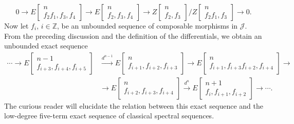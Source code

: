 \clearpage
{}%
\begingroup\small\setlength{\parskip}{0pt}\setlength{\emergencystretch}{2.5em}
\[
0\longrightarrow
E\!\begin{bmatrix}n\\ f_2f_1,f_3,f_4\end{bmatrix}
\longrightarrow
E\!\begin{bmatrix}n\\ f_2,f_3,f_4\end{bmatrix}
\longrightarrow
Z\!\begin{bmatrix}n\\ f_2,f_3\end{bmatrix}
 \Big/
Z\!\begin{bmatrix}n\\ f_2f_1,f_3\end{bmatrix}
\longrightarrow0.
\]
Now let $f_i$, $i\in\mathbb Z$, be an unbounded sequence of composable
morphisms in $\mathcal J$. From the preceding discussion and the definition
of the differentials, we obtain an unbounded exact sequence
\[
\begin{aligned}
\cdots\longrightarrow
E\!\begin{bmatrix}n-1\\ f_{i+3},f_{i+4},f_{i+5}\end{bmatrix}
&\xrightarrow{d^{n-1}}
E\!\begin{bmatrix}n\\ f_{i+1},f_{i+2},f_{i+3}\end{bmatrix}
\longrightarrow
E\!\begin{bmatrix}n\\ f_{i+1},f_{i+3}f_{i+2},f_{i+4}\end{bmatrix}
\longrightarrow{}\\[-1pt]
&\longrightarrow
E\!\begin{bmatrix}n\\ f_{i+2},f_{i+3},f_{i+4}\end{bmatrix}
\xrightarrow{d^n}
E\!\begin{bmatrix}n+1\\ f_i,f_{i+1},f_{i+2}\end{bmatrix}
\longrightarrow\cdots.
\end{aligned}
\]
The curious reader will elucidate the relation between this exact sequence
and the low-degree five-term exact sequence of classical spectral
sequences.

